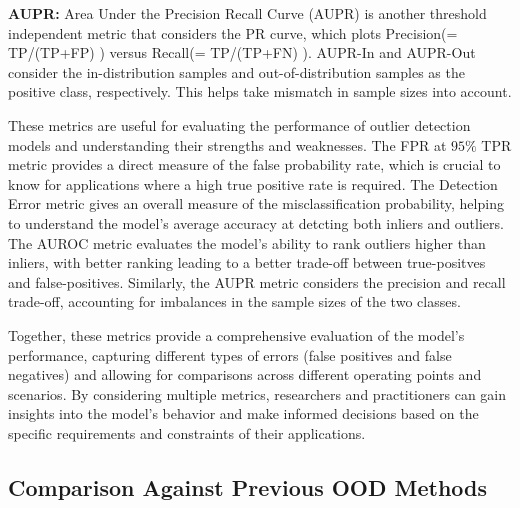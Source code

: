 \textbf{AUPR:} Area Under the Precision Recall Curve (AUPR) is another threshold independent metric that considers the PR curve, which plots Precision(= TP/(TP+FP) ) versus Recall(= TP/(TP+FN) ). AUPR-In and AUPR-Out consider the in-distribution samples and out-of-distribution samples as the positive class, respectively. This helps take mismatch in sample sizes into account.






These metrics are useful for evaluating the performance of outlier detection models and understanding their strengths and weaknesses. The FPR at $95\%$ TPR metric provides a direct measure of the false probability rate, which is crucial to know for applications where a high true positive rate is required. The Detection Error metric gives an overall measure of the misclassification probability, helping to understand the model's average accuracy at detcting both inliers and outliers. The AUROC metric evaluates the model's ability to rank outliers higher than inliers, with better ranking leading to a better trade-off between true-positves and false-positives. Similarly, the AUPR metric considers the precision and recall trade-off, accounting for imbalances in the sample sizes of the two classes.

Together, these metrics provide a comprehensive evaluation of the model's performance, capturing different types of errors (false positives and false negatives) and allowing for comparisons across different operating points and scenarios.
 By considering multiple metrics, researchers and practitioners can gain insights into the model's behavior and make informed decisions based on the specific requirements and constraints of their applications.



\subsection*{Comparison Against Previous OOD Methods}
\label{sec:ood_experiments}

